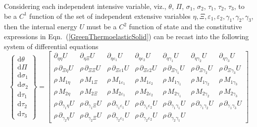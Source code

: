 Considering each independent intensive variable, viz., $\theta$, $\Pi$, $\sigma_1$, $\sigma_2$, $\tau_1$, $\tau_2$, $\tau_3$, to be a $C^1$ function of the set of independent extensive variables $\eta , \Xi , \varepsilon_1 , \varepsilon_2 , \gamma_1 , \gamma_2 , \gamma_3 $, then the internal energy $U$ must be a $C^2$ function of state and the constitutive expressions in Eqn.~(\ref{GreenThermoelasticSolid}) can be recast into the following system of differential equations
\footnotesize
\begin{equation}
\left\{ \begin{matrix}
\mathrm{d} \theta \\ \mathrm{d} \Pi \\
\mathrm{d} \sigma_1 \\ \mathrm{d} \sigma_2 \\ 
\mathrm{d} \tau_1 \\ \mathrm{d} \tau_2 \\ \mathrm{d} \tau_3
\end{matrix} \right\} = \begin{bmatrix}
\partial_{\eta\eta} U & 
\partial_{\eta\Xi} U & 
\partial_{\eta\varepsilon_1} U & 
\partial_{\eta\varepsilon_2} U &
\partial_{\eta\gamma_1} U &
\partial_{\eta\gamma_2} U &
\partial_{\eta\gamma_3} U \\ 
\rho \, \partial_{\Xi\eta} U & 
\rho \, \partial_{\Xi\Xi} U & 
\rho \, \partial_{\Xi\varepsilon1} U &
\rho \, \partial_{\Xi\varepsilon2} U &
\rho \, \partial_{\Xi\gamma_1} U &
\rho \, \partial_{\Xi\gamma_2} U &
\rho \, \partial_{\Xi\gamma_3} U \\
\rho \, M_{1\eta} & 
\rho \, M_{1\Xi} & 
\rho \, M_{1\varepsilon_1} & 
\rho \, M_{1\varepsilon_2} &
\rho \, M_{1\gamma_1} &
\rho \, M_{1\gamma_2} &
\rho \, M_{1\gamma_3} \\
\rho \, M_{2\eta} & 
\rho \, M_{2\Xi} & 
\rho \, M_{2\varepsilon_1} & 
\rho \, M_{2\varepsilon_2} &
\rho \, M_{2\gamma_1} &
\rho \, M_{2\gamma_2} &
\rho \, M_{2\gamma_3} \\
\rho \, \partial_{\gamma_1\eta} U & 
\rho \, \partial_{\gamma_1\Xi} U & 
\rho \, \partial_{\gamma_1\varepsilon_1} U & 
\rho \, \partial_{\gamma_1\varepsilon_2} U &
\rho \, \partial_{\gamma_1\gamma_1} U  &
\rho \, \partial_{\gamma_1\gamma_2} U &
\rho \, \partial_{\gamma_1\gamma_3} U \\
\rho \, \partial_{\gamma_2\eta} U & 
\rho \, \partial_{\gamma_2\Xi} U & 
\rho \, \partial_{\gamma_2\varepsilon_1} U & 
\rho \, \partial_{\gamma_2\varepsilon_2} U &
\rho \, \partial_{\gamma_2\gamma_1} U  &

\end{bmatrix}
\end{equation}

